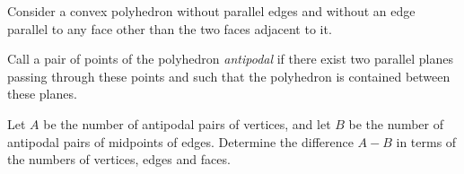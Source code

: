 Consider a convex polyhedron without parallel edges and without an edge parallel to any face other than the two faces adjacent to it.

Call a pair of points of the polyhedron \emph{antipodal} if there exist two parallel planes passing through these points and such that the polyhedron is contained between these planes.

Let $A$ be the number of antipodal pairs of vertices, and let $B$ be the number of antipodal pairs of midpoints of edges. Determine the difference $A - B$ in terms of the numbers of vertices, edges and faces.
